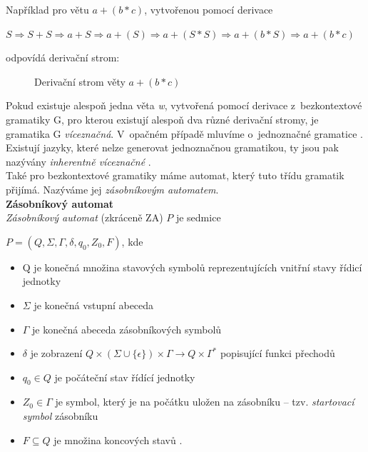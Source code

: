 \Bat{} Například pro větu $a + (b * c)$, vytvořenou pomocí derivace 
\vspace*{\baselineskip}
\begin{center}  
$S \Rightarrow S + S \Rightarrow a + S \Rightarrow a + (S) \Rightarrow a + (S * S) \Rightarrow a + (b * S) \Rightarrow a + (b * c)$
\end{center}
\vspace*{\baselineskip}
odpovídá derivační strom:

\begin{figure}[H]
\centering
{}
\leaf{+}
\leaf{(}
\leaf{*}
\leaf{)}
\qobitree
\caption{Derivační strom věty $a + (b * c)$}
\label{fig:dtree}
\end{figure}

Pokud existuje alespoň jedna věta \textit{w}, vytvořená pomocí derivace z~bezkontextové gramatiky G, pro kterou existují alespoň dva různé derivační 
stromy, je gramatika G \textit{víceznačná}. V~opačném případě mluvíme o~jednoznačné gramatice \cite[str. 61]{TIN2013}. 
Existují jazyky, které nelze generovat jednoznačnou gramatikou, ty jsou pak nazývány \textit{inherentně víceznačné} 
\cite[str. 61]{TIN2013}. \\

Také pro bezkontextové gramatiky máme automat, který tuto třídu gramatik přijímá. Nazýváme jej \textit{zásobníkovým automatem}. \\

\textbf{Zásobníkový automat} \\
\textit{Zásobníkový automat} (zkráceně ZA) $P$ je sedmice
\begin{center}  
$P = (Q, \Sigma, \Gamma, \delta, q_0, Z_0, F)$, kde
\end{center}
\begin{itemize}
\item Q je konečná množina stavových symbolů reprezentujících vnitřní stavy řídicí \mbox{jednotky}
\item $\Sigma$ je konečná vstupní abeceda
\item $\Gamma$ je konečná abeceda zásobníkových symbolů
\item $\delta$ je zobrazení $Q \times (\Sigma \cup \{\epsilon\}) \times \Gamma \rightarrow Q \times \Gamma^*$ popisující funkci přechodů
\item $q_0 \in Q$ je počáteční stav řídící jednotky
\item $Z_0 \in \Gamma$ je symbol, který je na počátku uložen na zásobníku -- tzv. \textit{startovací symbol} zásobníku
\item $F \subseteq Q$ je množina koncových stavů \cite[str. 81]{TIN2013}.
\end{itemize}
\vspace*{\baselineskip} 

